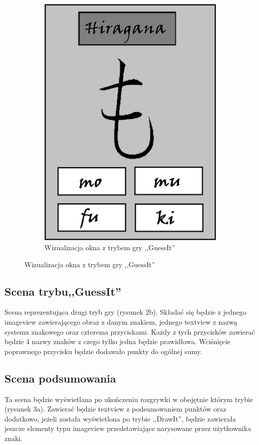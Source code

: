 \documentclass[15pt]{article}
\begin{document}
\begin{figure}[h!]
\begin{subfigure}[b]{0.35\linewidth}
      \includegraphics[width=\linewidth]{guess.png}
      \caption{Wizualizacja okna z trybem gry ,,GuessIt''}
    \end{subfigure}
    \label{fig:coffee}
  \end{figure}

  
  \subsection{Scena trybu,,GuessIt''}
  
  Scena reprezentująca drugi tryb gry (rysunek 2b). Składać się będzie z jednego imageview zawierającego obraz z danym znakiem, jednego textview z nazwą systemu znakowego oraz czterema przyciskami. Każdy z tych przycisków zawierać będzie 4 nazwy znaków z czego tylko jedna będzie prawidłowa. Wciśnięcie poprawnego przycisku będzie dodawało punkty do ogólnej sumy.
  
  \subsection{Scena podsumowania}
  Ta scena będzie wyświetlana po ukończeniu rozgrywki w obojętnie którym trybie (rysunek 3a). Zawierać będzie textview z podsumowaniem punktów oraz dodatkowo, jeżeli została wyświetlona po trybie ,,DrawIt'', będzie zawierała jeszcze elementy typu imageview przedstawiające narysowane przez użytkownika znaki.
  
\end{document}
